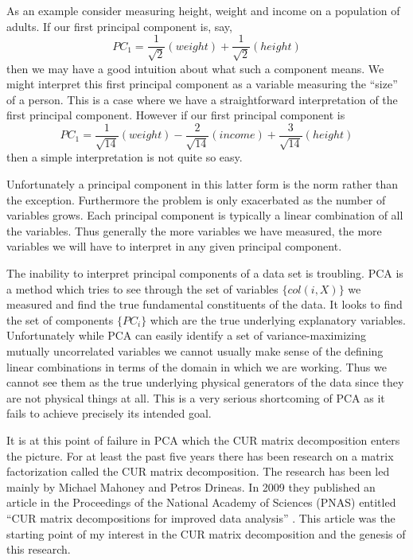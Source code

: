 \documentclass{book}
\begin{document}
As an example consider measuring height, weight and income on a population of adults. If our first principal component is, say, 
$$
PC_1=\frac{1}{\sqrt{2}}(weight)+\frac{1}{\sqrt{2}}(height)
$$
then we may have a good intuition about what such a component means. We might interpret this first principal component as a variable measuring the ``size'' of a person. This is a case where we have a straightforward interpretation of the first principal component. However if our first principal component is
$$
PC_1=\frac{1}{\sqrt{14}}(weight)-\frac{2}{\sqrt{14}}(income)+\frac{3}{\sqrt{14}}(height)
$$
then a simple interpretation is not quite so easy.

Unfortunately a principal component in this latter form is the norm rather than the exception. Furthermore the problem is only exacerbated as the number of variables grows. Each principal component is typically a linear combination of all the variables. Thus generally the more variables we have measured, the more variables we will have to interpret in any given principal component. 

The inability to interpret principal components of a data set is troubling. PCA is a method which tries to see through the set of variables $\{col(i,X)\}$ we measured and find the true fundamental constituents of the data. It looks to find the set of components $\{PC_i\}$ which are the true underlying explanatory variables. Unfortunately while PCA can easily identify a set of variance-maximizing mutually uncorrelated variables we cannot usually make sense of the defining linear combinations in terms of the domain in which we are working. Thus we cannot see them as the true underlying physical generators of the data since they are not physical things at all. This is a very serious shortcoming of PCA as it fails to achieve precisely its intended goal.

It is at this point of failure in PCA which the CUR matrix decomposition enters the picture. For at least the past five years there has been research on a matrix factorization called the CUR matrix decomposition. The research has been led mainly by Michael Mahoney and Petros Drineas. In 2009 they published an article in the Proceedings of the National Academy of Sciences (PNAS) entitled ``CUR matrix decompositions for improved data analysis'' \cite{pnas}. This article was the starting point of my interest in the CUR matrix decomposition and the genesis of this research. 
\end{document}
